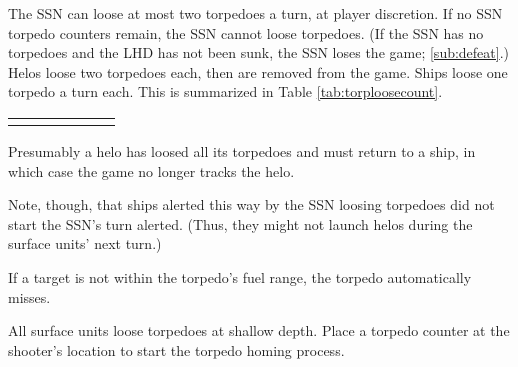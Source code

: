 \documentclass[../TacSubMicroRules.tex]{subfiles}
\begin{document}
 
The SSN can loose at most two torpedoes a turn, at player discretion.
If no SSN torpedo counters remain, the SSN cannot loose torpedoes.
(If the SSN has no torpedoes and the LHD has not been sunk, the SSN loses the game; \ref{sub:defeat}.)
Helos loose two torpedoes each, then are removed from the game.
Ships loose one torpedo a turn each.
This is summarized in Table \ref{tab:torploosecount}.
\begin{Table}
    \centering
    \begin{tabular}{R{0.15\linewidth}|L{0.65\linewidth}}
        \hline
        \hline
        \hline
        \hline
    \end{tabular}
    \label{tab:torploosecount}
\end{Table}

\begin{design}
    Presumably a helo has loosed all its torpedoes and must return to a ship, in which case the game no longer tracks the helo.
\end{design}

 
Note, though, that ships alerted this way by the SSN loosing torpedoes did not start the SSN's turn alerted.
(Thus, they might not launch helos during the surface units' next turn.)

 
If a target is not within the torpedo's fuel range, the torpedo automatically misses.

 
All surface units loose torpedoes at shallow depth.
Place a torpedo counter at the shooter's location to start the torpedo homing process.
\end{document}
